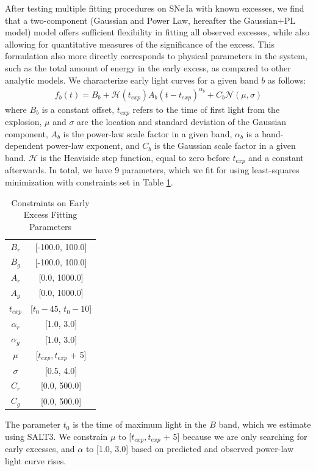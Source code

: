 \documentclass[twocolumn,twocolappendix, linenumbers]{aastex631} %
\begin{document}
After testing multiple fitting procedures on SNe\,Ia with known excesses, we find that a two-component (Gaussian and Power Law, hereafter the Gaussian$+$PL model) model offers sufficient flexibility in fitting all observed excesses, while also allowing for quantitative measures of the significance of the excess. This formulation also more directly corresponds to physical parameters in the system, such as the total amount of energy in the early excess, as compared to other analytic models.  We characterize early light curves for a given band $b$ as follows:
\begin{multline}
    f_b(t) = B_b + \mathcal{H}(t_{exp})A_b(t-t_{exp})^{\alpha_{b}} + C_b \mathcal{N}(\mu, \sigma)
\end{multline}
where $B_b$ is a constant offset, $t_{exp}$ refers to the time of first light from the explosion, $\mu$ and $\sigma$ are the location and standard deviation of the Gaussian component, $A_b$ is the power-law scale factor in a given band, $\alpha_b$ is a band-dependent power-law exponent, and $C_b$ is the Gaussian scale factor in a given band. $\mathcal{H}$ is the Heaviside step function, equal to zero before $t_{exp}$ and a constant afterwards.  In total, we have 9 parameters, which we fit for using least-squares minimization with constraints set in Table \ref{table:prior}.

\begin{table}[h!]
\centering
\caption{Constraints on Early Excess Fitting Parameters}
\begin{tabular}{ |c|c|} 
 \hline
 $B_r$ & [-100.0, 100.0] \\
 $B_g$ & [-100.0, 100.0] \\
 $A_r$ & [0.0, 1000.0] \\
 $A_g$ & [0.0, 1000.0] \\
 $t_{exp}$ & [$t_0 - 45$, $t_0 - 10$] \\
 $\alpha_r$ & [1.0, 3.0] \\
 $\alpha_g$ & [1.0, 3.0] \\
 $\mu$ & [$t_{exp}, t_{exp}$ + 5] \\
 $\sigma$ & [0.5, 4.0] \\
 $C_r$ & [0.0, 500.0] \\
 $C_g$ & [0.0, 500.0] \\
 \hline
\end{tabular}
\label{table:prior}
\end{table}

\noindent The parameter $t_0$ is the time of maximum light in the $B$ band, which we estimate using SALT3. We constrain $\mu$ to [$t_{exp}, t_{exp}$ + 5] because we are only searching for early excesses, and $\alpha$ to [1.0, 3.0] based on predicted and observed power-law light curve rises.
\end{document}
